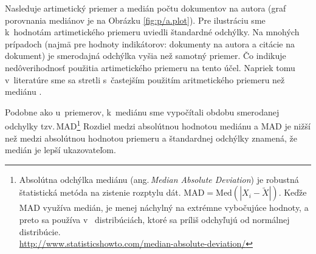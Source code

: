 Nasleduje artimetický priemer a medián počtu dokumentov na autora (graf
porovnania mediánov je na Obrázku \ref{fig:p/a.plot}).  Pre ilustráciu sme
k~hodnotám artimetického priemeru uviedli štandardné odchýlky.  Na mnohých
prípadoch (najmä pre hodnoty indikátorov: dokumenty na autora a citácie na
dokument) je smerodajná odchýlka vyšia než samotný priemer. Čo indikuje
nedôverihodnosť použitia artimetického priemeru na tento účel. Napriek tomu
v~literatúre sme sa stretli s~častejším použitím aritmetického priemeru než
mediánu \citep{Lazaridis2010}.

Podobne ako u~priemerov, k~mediánu sme vypočítali obdobu smerodanej odchylky
tzv.\,MAD\footnote{Absolútna odchýlka mediánu (ang.\,\emph{Median Absolute
    Deviation}) je robustná štatistická metóda na zistenie rozptylu dát.
  $\mathrm{MAD} = \mathrm{Med}(|X_i - \tilde{X}|)$.  Keďže MAD využíva medián,
  je menej náchylný na extrémne vybočujúce hodnoty, a preto sa používa v~
  distribúciách, ktoré sa príliš odchyľujú od normálnej
  distribúcie.\\\url{http://www.statisticshowto.com/median-absolute-deviation/}}
Rozdiel medzi absolútnou hodnotou mediánu a MAD je nižší než medzi absolútnou
hodnotou priemeru a štandardnej odchýlky znamená, že medián je lepší
ukazovateľom.

